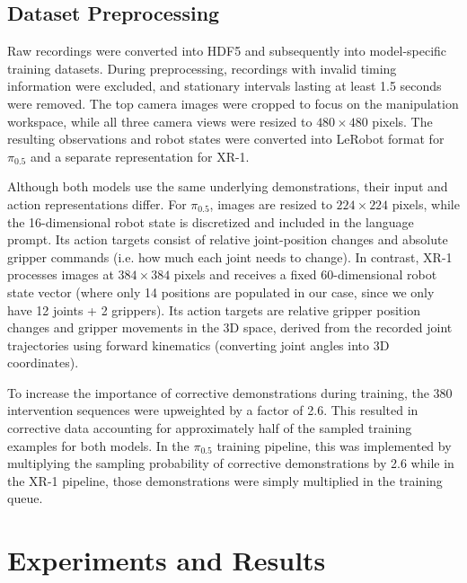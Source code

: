 \documentclass[10pt,twocolumn,letterpaper]{article}
\begin{document}
\subsection{Dataset Preprocessing}

Raw recordings were converted into HDF5 and subsequently into model-specific training datasets. During preprocessing, recordings with invalid timing information were excluded, and stationary intervals lasting at least 1.5 seconds were removed. The top camera images were cropped to focus on the manipulation workspace, while all three camera views were resized to $480 \times 480$ pixels. The resulting observations and robot states were converted into LeRobot format for $\pi_{0.5}$ and a separate representation for XR-1.

Although both models use the same underlying demonstrations, their input and action representations differ. For $\pi_{0.5}$, images are resized to $224 \times 224$ pixels, while the 16-dimensional robot state is discretized and included in the language prompt. Its action targets consist of relative joint-position changes and absolute gripper commands (i.e. how much each joint needs to change). In contrast, XR-1 processes images at $384 \times 384$ pixels and receives a fixed 60-dimensional robot state vector (where only 14 positions are populated in our case, since we only have 12 joints + 2 grippers). Its action targets are relative gripper position changes and gripper movements in the 3D space, derived from the recorded joint trajectories using forward kinematics (converting joint angles into 3D coordinates).

To increase the importance of corrective demonstrations during training, the 380 intervention sequences were upweighted by a factor of 2.6. This resulted in corrective data accounting for approximately half of the sampled training examples for both models. In the $\pi_{0.5}$ training pipeline, this was implemented by multiplying the sampling probability of corrective demonstrations by 2.6 while in the XR-1 pipeline, those demonstrations were simply multiplied in the training queue.  

\section{Experiments and Results}
\end{document}
